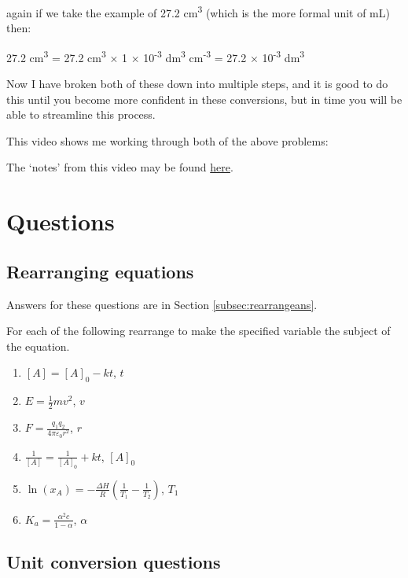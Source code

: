 \documentclass[
]{book}
\providecommand{\tightlist}{%
  \setlength{\itemsep}{0pt}\setlength{\parskip}{0pt}}
\begin{document}
again if we take the example of 27.2 cm\textsuperscript{3} (which is the more formal unit of mL) then:

27.2 cm\textsuperscript{3} = 27.2 cm\textsuperscript{3} × 1 × 10\textsuperscript{-3} dm\textsuperscript{3} cm\textsuperscript{-3} = 27.2 × 10\textsuperscript{-3} dm\textsuperscript{3}

Now I have broken both of these down into multiple steps, and it is good to do this until you become more confident in these conversions, but in time you will be able to streamline this process.

This video shows me working through both of the above problems:

The `notes' from this video may be found \href{http://workitoutwithapencil.xyz/wp-content/uploads/2021/07/UnitConversions.pdf}{here}.

\hypertarget{sec:QuestionsUnits}{%
\section{Questions}\label{sec:QuestionsUnits}}

\hypertarget{subsec:rearrange}{%
\subsection{Rearranging equations}\label{subsec:rearrange}}

Answers for these questions are in Section \ref{subsec:rearrangeans}.

For each of the following rearrange to make the specified variable the subject of the equation.

\begin{enumerate}
\def\labelenumi{\arabic{enumi}.}
\tightlist
\item
  \([A]= [A]_0 - kt\), \(t\)
\item
  \(E = \frac{1}{2}mv^2\), \(v\)
\item
  \(F = \frac{q_1 q_2}{4 \pi \varepsilon _0 r^2}\), \(r\)
\item
  \(\frac{1}{[A]}=\frac{1}{[A]_0}+kt\), \([A]_0\)
\item
  \(\ln (x_A)=-\frac{\Delta H}{R}(\frac{1}{T_1}-\frac{1}{T_2})\), \(T_1\)
\item
  \(K_a=\frac{\alpha ^2 c}{1- \alpha}\), \(\alpha\)
\end{enumerate}

\hypertarget{subsec:Unitconv}{%
\subsection{Unit conversion questions}\label{subsec:Unitconv}}
\end{document}
